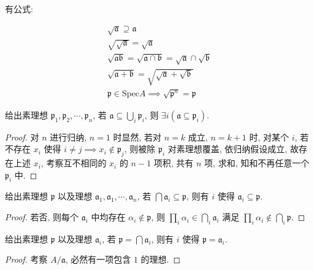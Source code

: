 \begin{lemma}
    有公式:

    \[
        \begin{aligned}
            \sqrt{\mathfrak{a}} \supseteq \mathfrak{a} \\
            \sqrt{\sqrt{\mathfrak{a}}} = \sqrt{\mathfrak{a}} \\
            \sqrt{\mathfrak{a} \mathfrak{b}} = \sqrt{\mathfrak{a} \cap \mathfrak{b}} = \sqrt{\mathfrak{a}} \cap \sqrt{\mathfrak{b}} \\
            \sqrt{\mathfrak{a} + \mathfrak{b}} = \sqrt{\sqrt{\mathfrak{a}} + \sqrt{\mathfrak{b}}} \\
            \mathfrak{p} \in \mathrm{Spec} A \implies \sqrt{\mathfrak{p}^n} = \mathfrak{p}
        \end{aligned}
    \]
\end{lemma}

\begin{lemma}
    给出素理想 \(\mathfrak{p}_1,\mathfrak{p}_2,\cdots, \mathfrak{p}_n\), 若 \(\mathfrak{a} \subseteq \bigcup_i \mathfrak{p}_i\),
    则 \(\exists i (\mathfrak{a} \subseteq \mathfrak{p}_i)\).

    \begin{proof}
        对 \(n\) 进行归纳, \(n = 1\) 时显然, 若对 \(n = k\) 成立, \(n = k+1\) 时,
        对某个 \(i\), 若不存在 \(x_i\) 使得 \(i \neq j \implies x_i \notin \mathfrak{p}_j\), 则被除 \(\mathfrak{p}_i\) 对素理想覆盖,
        依归纳假设成立, 故存在上述 \(x_i\), 考察互不相同的 \(x_i\) 的 \(n-1\) 项积, 共有 \(n\) 项, 求和, 知和不再任意一个 \(\mathfrak{p}_i\) 中.
    \end{proof}
\end{lemma}

\begin{lemma}
    给出素理想 \(\mathfrak{p}\) 以及理想 \(\mathfrak{a}_1,\mathfrak{a}_1, \cdots, \mathfrak{a}_n\), 若 \(\bigcap \mathfrak{a}_i \subseteq \mathfrak{p}\),
    则有 \(i\) 使得 \(\mathfrak{a}_i \subseteq \mathfrak{p}\).

    \begin{proof}
        若否, 则每个 \(\mathfrak{a}_i\) 中均存在 \(\alpha_i \notin \mathfrak{p}\),
        则 \(\prod_i \alpha_i \in \bigcap_i \mathfrak{a}_i\) 满足 \(\prod_i \alpha_i \notin \bigcap_i \mathfrak{p}\).
    \end{proof}
\end{lemma}

\begin{lemma}
    给出素理想 \(\mathfrak{p}\) 以及理想 \(\mathfrak{a}_i\), 若 \(\mathfrak{p} = \bigcap \mathfrak{a}_i\), 则有 \(i\) 使得 \(\mathfrak{p} = \mathfrak{a}_i\).

    \begin{proof}
        考察 \(A / \mathfrak{a}\), 必然有一项包含 \(1\) 的理想.
    \end{proof}
\end{lemma}

